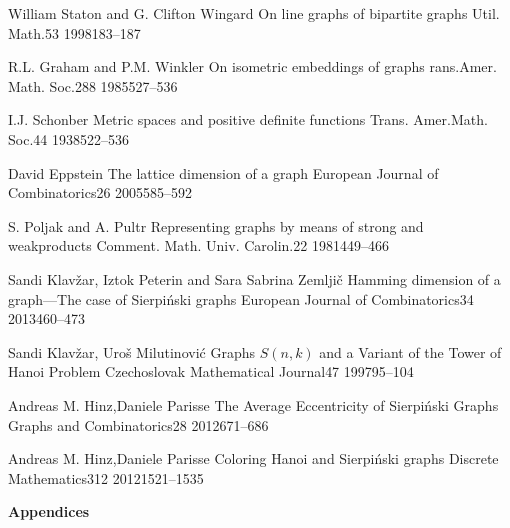 \documentclass[12pt,a4paper,titlepage,openany]{report}
\begin{document}
 \begin{thebibliography}{99}
\thispagestyle{fancy}

  \articleInJournalManyAuthors
    {William Staton and G. Clifton Wingard}
    {On line graphs of bipartite graphs}
   {Util. Math.}{53}
   {1998}{183--187} 

  \articleInJournalManyAuthors
    {R.L. Graham and P.M. Winkler}
    {On isometric embeddings of graphs}
   {rans.Amer. Math. Soc.}{288}
   {1985}{527--536}

\articleInJournalOneAuthor
    {I.J. Schonber}
    {Metric spaces and positive definite functions}
   {Trans. Amer.Math. Soc.}{44}
   {1938}{522--536}

\articleInJournalOneAuthor
    {David Eppstein}
    {The lattice dimension of a graph}
   {European Journal of Combinatorics}{26}
   {2005}{585--592} 

  \articleInJournalManyAuthors
    {S. Poljak and A. Pultr}
    {Representing graphs by means of strong and weakproducts}
   {Comment. Math. Univ. Carolin.}{22}
   {1981}{449--466}  
   
  \articleInJournalManyAuthors
    {Sandi Klav\v zar, Iztok Peterin and Sara Sabrina Zemlji\v c}
    {Hamming dimension of a graph—The case of Sierpi\'nski graphs}
   {European Journal of Combinatorics}{34}
   {2013}{460--473}

  \articleInJournalManyAuthors
    {Sandi Klav\v zar, Uro\v s Milutinovi\' c}
    {Graphs $S(n, k)$ and a Variant of the Tower of Hanoi Problem}
   {Czechoslovak Mathematical Journal}{47}
   {1997}{95--104}

  \articleInJournalManyAuthors
    {Andreas M. Hinz,Daniele Parisse}
    {The Average Eccentricity of Sierpiński Graphs}
   {Graphs and Combinatorics}{28}
   {2012}{671--686}
   
  \articleInJournalManyAuthors
    {Andreas M. Hinz,Daniele Parisse}
    {Coloring Hanoi and Sierpiński graphs}
   {Discrete Mathematics}{312}
   {2012}{1521--1535}   

\end{thebibliography}
\newpage


\pagestyle{fancyplain}
\vspace*{\fill}
     \begin{center}
          \bf{\Huge{Appendices}}
     \end{center}
\vspace*{\fill}
\thispagestyle{fancy}
\end{document}
